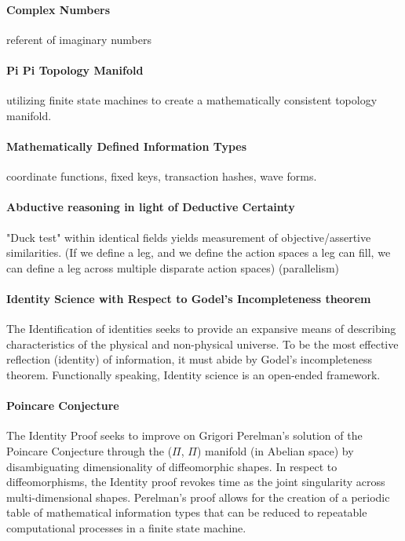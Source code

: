 \documentclass{article}
\begin{document}
		\paragraph{Complex Numbers} referent of imaginary numbers
		\paragraph{Pi Pi Topology Manifold} utilizing finite state machines to create a mathematically consistent topology manifold.
		\paragraph{Mathematically Defined Information Types} coordinate functions, fixed keys, transaction hashes, wave forms.
		\paragraph{Abductive reasoning in light of Deductive Certainty}
				"Duck test" within identical fields yields measurement of objective/assertive similarities.
				(If we define a leg, and we define the action spaces a leg can fill, we can define a leg across multiple disparate action spaces)  (parallelism)
		\paragraph{Identity Science with Respect to Godel's Incompleteness theorem}
				The Identification of identities seeks to provide an expansive means of describing characteristics of the physical and non-physical universe.  To be the most effective reflection (identity) of information, it must abide by Godel's incompleteness theorem.  Functionally speaking, Identity science is an open-ended framework.
		\paragraph{Poincare Conjecture}
			The Identity Proof seeks to improve on Grigori Perelman's solution of the Poincare Conjecture through the ($\Pi$, $\Pi$) manifold (in Abelian space) by disambiguating dimensionality of diffeomorphic shapes.  In respect to diffeomorphisms, the Identity proof revokes time as the joint singularity across multi-dimensional shapes.  Perelman's proof allows for the creation of a periodic table of mathematical information types that can be reduced to repeatable computational processes in a finite state machine.
		
\end{document}
